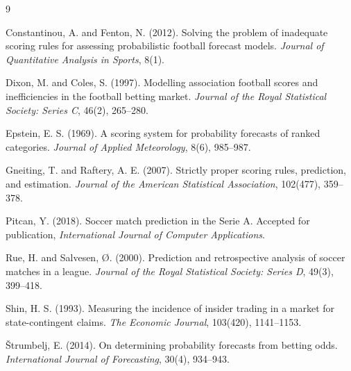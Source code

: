 \documentclass[11pt]{article}
\begin{document}
\begin{thebibliography}{9}

Constantinou, A. and Fenton, N. (2012).
Solving the problem of inadequate scoring rules for assessing probabilistic
football forecast models.
\emph{Journal of Quantitative Analysis in Sports}, 8(1).

Dixon, M. and Coles, S. (1997).
Modelling association football scores and inefficiencies in the football betting
market.
\emph{Journal of the Royal Statistical Society: Series C}, 46(2), 265--280.

Epstein, E. S. (1969).
A scoring system for probability forecasts of ranked categories.
\emph{Journal of Applied Meteorology}, 8(6), 985--987.

Gneiting, T. and Raftery, A. E. (2007).
Strictly proper scoring rules, prediction, and estimation.
\emph{Journal of the American Statistical Association}, 102(477), 359--378.

Pitcan, Y. (2018).
Soccer match prediction in the Serie A.
Accepted for publication, \emph{International Journal of Computer Applications}.

Rue, H. and Salvesen, {\O}. (2000).
Prediction and retrospective analysis of soccer matches in a league.
\emph{Journal of the Royal Statistical Society: Series D}, 49(3), 399--418.

Shin, H. S. (1993).
Measuring the incidence of insider trading in a market for state-contingent
claims.
\emph{The Economic Journal}, 103(420), 1141--1153.

{\v S}trumbelj, E. (2014).
On determining probability forecasts from betting odds.
\emph{International Journal of Forecasting}, 30(4), 934--943.

\end{thebibliography}
\end{document}

